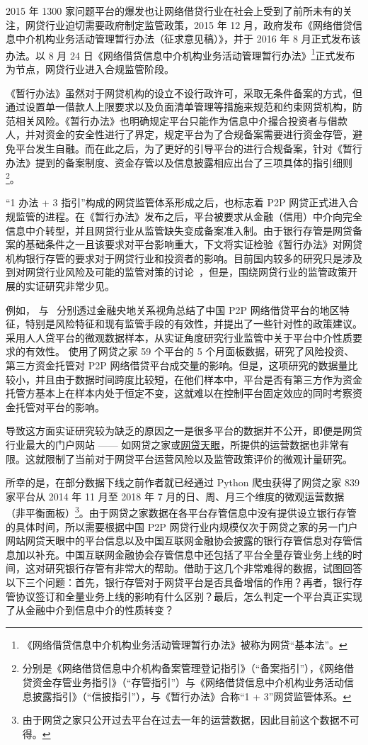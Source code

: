 \documentclass[lang=cn,11pt]{elegantpaper}
\begin{document}
2015 年 1300 家问题平台的爆发也让网络借贷行业在社会上受到了前所未有的关注，网贷行业迫切需要政府制定监管政策，2015 年 12 月，政府发布《网络借贷信息中介机构业务活动管理暂行办法（征求意见稿）》，并于 2016 年 8 月正式发布该办法。以 8 月 24 日《网络借贷信息中介机构业务活动管理暂行办法》\footnote{《网络借贷信息中介机构业务活动管理暂行办法》被称为网贷“基本法”。}正式发布为节点，网贷行业进入合规监管阶段。

《暂行办法》虽然对于网贷机构的设立不设行政许可，采取无条件备案的方式，但通过设置单一借款人上限要求以及负面清单管理等措施来规范和约束网贷机构，防范相关风险。《暂行办法》也明确规定平台只能作为信息中介撮合投资者与借款人，并对资金的安全性进行了界定，规定平台为了合规备案需要进行资金存管，避免平台发生自融。而在此之后，为了更好的引导平台的进行合规备案，针对《暂行办法》提到的备案制度、资金存管以及信息披露相应出台了三项具体的指引细则\footnote{ 分别是《网络借贷信息中介机构备案管理登记指引》（“备案指引”），《网络借贷资金存管业务指引》（“存管指引”）与《网络借贷信息中介机构业务活动信息披露指引》（“信披指引”），与《暂行办法》合称“1 + 3”网贷监管体系。}。

“1 办法 + 3 指引”构成的网贷监管体系形成之后，也标志着 P2P 网贷正式进入合规监管的进程。在《暂行办法》发布之后，平台被要求从金融（信用）中介向完全信息中介转型，并且网贷行业从监管缺失变成备案准入制。由于银行存管是网贷备案的基础条件之一且该要求对平台影响重大，下文将实证检验《暂行办法》对网贷机构银行存管的要求对于网贷行业和投资者的影响。目前国内较多的研究只是涉及到对网贷行业风险及可能的监管对策的讨论~\citep{lsq2014,wj2015,awhxmy2016}，但是，围绕网贷行业的监管政策开展的实证研究非常少见。

例如，\cite{gf2016} 与~\cite{tym2017} 分别透过金融央地关系视角总结了中国 P2P 网络借贷平台的地区特征，特别是风险特征和现有监管手段的有效性，并提出了一些针对性的政策建议。\cite{xsypylwyq2018} 采用人人贷平台的微观数据样本，从实证角度研究行业监管中关于平台中介性质要求的有效性。\cite{lsxlh2015} 使用了网贷之家 59 个平台的 5 个月面板数据，研究了风险投资、第三方资金托管对 P2P 网络借贷平台成交量的影响。但是，这项研究的数据量比较小，并且由于数据时间跨度比较短，在他们样本中，平台是否有第三方作为资金托管方基本上在样本内处于恒定不变，这就难以在控制平台固定效应的同时考察资金托管对平台的影响。

导致这方面实证研究较为缺乏的原因之一是很多平台的数据并不公开，即便是网贷行业最大的门户网站 —— 如网贷之家或\href{https://www.p2peye.com/}{网贷天眼}，所提供的运营数据也非常有限。这就限制了当前对于网贷平台运营风险以及监管政策评价的微观计量研究。

所幸的是，在部分数据下线之前作者就已经通过 Python 爬虫获得了网贷之家 839 家平台从 2014 年 11 月至 2018 年 7 月的日、周、月三个维度的微观运营数据（非平衡面板）\footnote{由于网贷之家只公开过去平台在过去一年的运营数据，因此目前这个数据不可得。}。由于网贷之家数据在各平台存管信息中没有提供设立银行存管的具体时间，所以需要根据中国 P2P 网贷行业内规模仅次于网贷之家的另一门户网站网贷天眼中的平台信息以及中国互联网金融协会披露的银行存管信息对存管信息加以补充。中国互联网金融协会存管信息中还包括了平台全量存管业务上线的时间，这对研究银行存管有非常大的帮助。借助于这几个非常难得的数据，试图回答以下三个问题：首先，银行存管对于网贷平台是否具备增信的作用？再者，银行存管协议签订和全量业务上线的影响有什么区别？最后，怎么判定一个平台真正实现了从金融中介到信息中介的性质转变？
\end{document}
